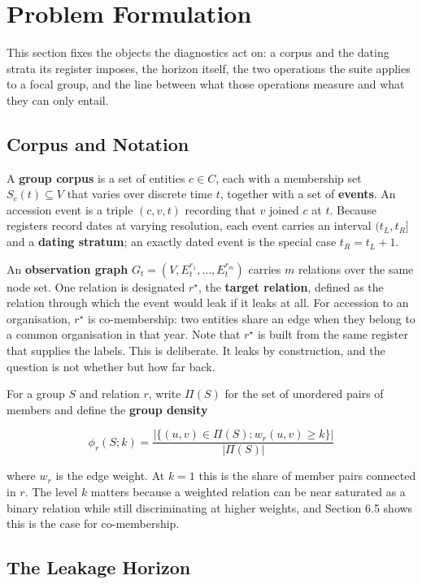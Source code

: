 \documentclass[twoside,11pt]{article}
\begin{document}
\section{Problem Formulation}

This section fixes the objects the diagnostics act on: a corpus and the dating strata its register imposes, the horizon itself, the two operations the suite applies to a focal group, and the line between what those operations measure and what they can only entail.

\subsection{Corpus and Notation}

A \textbf{group corpus} is a set of entities \(c \in C\), each with a membership set \(S_{c}(t) \subseteq V\) that varies over discrete time \(t\), together with a set of \textbf{events}. An accession event is a triple \((c,v,t)\) recording that \(v\) joined \(c\) at \(t\). Because registers record dates at varying resolution, each event carries an interval \((t_{L},t_{R}\rbrack\) and a \textbf{dating stratum}; an exactly dated event is the special case \(t_{R} = t_{L} + 1\).

An \textbf{observation graph} \(G_{t} = (V,E_{t}^{r_{1}},\ldots,E_{t}^{r_{m}})\) carries \(m\) relations over the same node set. One relation is designated \(r^{\star}\), the \textbf{target relation}, defined as the relation through which the event would leak if it leaks at all. For accession to an organisation, \(r^{\star}\) is co-membership: two entities share an edge when they belong to a common organisation in that year. Note that \(r^{\star}\) is built from the same register that supplies the labels. This is deliberate. It leaks by construction, and the question is not whether but how far back.

For a group \(S\) and relation \(r\), write \(\Pi(S)\) for the set of unordered pairs of members and define the \textbf{group density}

\[\phi_{r}(S;k) = \frac{|\{(u,v) \in \Pi(S):w_{r}(u,v) \geq k\}|}{|\Pi(S)|}\]

where \(w_{r}\) is the edge weight. At \(k = 1\) this is the share of member pairs connected in \(r\). The level \(k\) matters because a weighted relation can be near saturated as a binary relation while still discriminating at higher weights, and Section 6.5 shows this is the case for co-membership.

\subsection{The Leakage Horizon}
\end{document}
